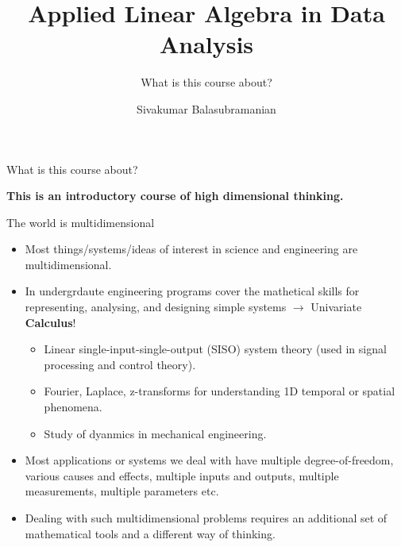 \documentclass[aspectratio=169]{beamer}
\title{Applied Linear Algebra in Data Analysis}
\subtitle{What is this course about?}
\author{Sivakumar Balasubramanian}
\institute[Christian Medical College] %
{
  \inst{}%
  Department of Bioengineering\\
  Christian Medical College, Bagayam\\
  Vellore 632002
}
\date{}
\let\olditem\item
\renewcommand{\item}{\setlength{\itemsep}{\fill}\olditem}
\begin{document}
\begin{frame}
  \titlepage
\end{frame}


\begin{frame}[t]{What is this course about?}
  \vspace{2cm}
  \begin{center}
    \textcolor{myred}{\huge \textbf{This is an introductory course of high dimensional thinking.}}
  \end{center}
\end{frame}


\begin{frame}[t]{The world is multidimensional}
\begin{itemize}
  \item Most things/systems/ideas of interest in science and engineering are multidimensional.
  \item In undergrdaute engineering programs cover the mathetical skills for representing, analysing, and designing simple systems $\longrightarrow$ Univariate \textbf{Calculus}!
  \begin{itemize}
    \item Linear single-input-single-output (SISO) system theory (used in signal processing and control theory).
    \item Fourier, Laplace, z-transforms for understanding 1D temporal or spatial phenomena.
    \item Study of dyanmics in mechanical engineering.
  \end{itemize}
  \item Most applications or systems we deal with have multiple degree-of-freedom, various causes and effects, multiple inputs and outputs, multiple measurements, multiple parameters etc.
  \item Dealing with such multidimensional problems requires an additional set of mathematical tools and a different way of thinking. 
\end{itemize}
\end{frame}
\end{document}
